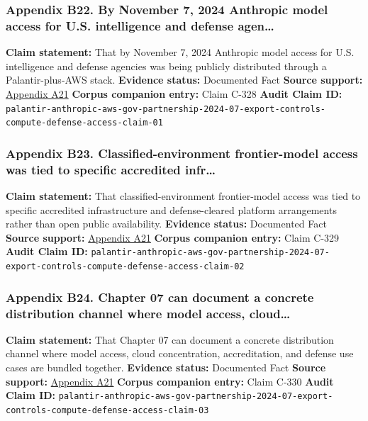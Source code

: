 \documentclass[
  american,
  11pt,
  letterpaper,
]{article}
\begin{document}
\subsubsection{Appendix B22. By November 7, 2024 Anthropic model access
for U.S. intelligence and defense
agen\ldots{}}\label{ch-10-appendix-b22-by-november-7-2024-anthropic-model-access-for-u-s-intelligence-and-defense-agen}

\textbf{Claim statement:} That by November 7, 2024 Anthropic model
access for U.S. intelligence and defense agencies was being publicly
distributed through a Palantir-plus-AWS stack. \textbf{Evidence status:}
Documented Fact \textbf{Source support:}
\hyperref[ch-10-appendix-a21-anthropic-and-palantir-partner-to-bring-claude-ai-models-to-aws-for-u-s-government-intelligence-and-defense-operations]{Appendix
A21} \textbf{Corpus companion entry:} Claim C-328 \textbf{Audit Claim
ID:}
\texttt{palantir-anthropic-aws-gov-partnership-2024-07-export-controls-compute-defense-access-claim-01}

\subsubsection{Appendix B23. Classified-environment frontier-model
access was tied to specific accredited
infr\ldots{}}\label{ch-10-appendix-b23-classified-environment-frontier-model-access-was-tied-to-specific-accredited-infr}

\textbf{Claim statement:} That classified-environment frontier-model
access was tied to specific accredited infrastructure and
defense-cleared platform arrangements rather than open public
availability. \textbf{Evidence status:} Documented Fact \textbf{Source
support:}
\hyperref[ch-10-appendix-a21-anthropic-and-palantir-partner-to-bring-claude-ai-models-to-aws-for-u-s-government-intelligence-and-defense-operations]{Appendix
A21} \textbf{Corpus companion entry:} Claim C-329 \textbf{Audit Claim
ID:}
\texttt{palantir-anthropic-aws-gov-partnership-2024-07-export-controls-compute-defense-access-claim-02}

\subsubsection{Appendix B24. Chapter 07 can document a concrete
distribution channel where model access,
cloud\ldots{}}\label{ch-10-appendix-b24-chapter-07-can-document-a-concrete-distribution-channel-where-model-access-cloud}

\textbf{Claim statement:} That Chapter 07 can document a concrete
distribution channel where model access, cloud concentration,
accreditation, and defense use cases are bundled together.
\textbf{Evidence status:} Documented Fact \textbf{Source support:}
\hyperref[ch-10-appendix-a21-anthropic-and-palantir-partner-to-bring-claude-ai-models-to-aws-for-u-s-government-intelligence-and-defense-operations]{Appendix
A21} \textbf{Corpus companion entry:} Claim C-330 \textbf{Audit Claim
ID:}
\texttt{palantir-anthropic-aws-gov-partnership-2024-07-export-controls-compute-defense-access-claim-03}
\end{document}
